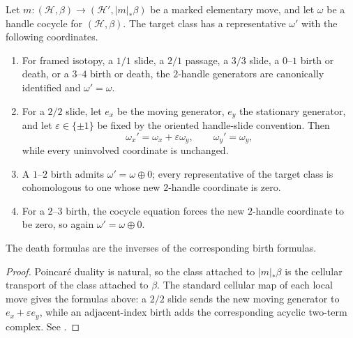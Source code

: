 \begin{proposition}
\label{prop:marking-coordinate-transport}
Let \(m\colon(\mathcal H,\beta)\to
(\mathcal H',|m|_*\beta)\) be a marked elementary move, and let \(\omega\)
be a handle cocycle for \((\mathcal H,\beta)\).  The target class has a
representative \(\omega'\) with the following coordinates.
\begin{enumerate}[label=(\roman*),ref=\roman*]
  \item For framed isotopy, a \(1/1\) slide, a \(2/1\) passage, a
  \(3/3\) slide, a \(0\)--\(1\) birth or death, or a \(3\)--\(4\) birth or
  death, the \(2\)-handle generators are canonically identified and
  \(\omega'=\omega\).

  \item For a \(2/2\) slide, let \(e_x\) be the moving generator,
  \(e_y\) the stationary generator, and let
  \(\varepsilon\in\{\pm1\}\) be fixed by the oriented handle-slide
  convention.  Then
  \begin{equation}
    \omega_x'=\omega_x+\varepsilon\omega_y,
    \qquad
    \omega_y'=\omega_y,
    \label{eq:two-two-marking-transport}
  \end{equation}
  while every uninvolved coordinate is unchanged.

  \item A \(1\)--\(2\) birth admits \(\omega'=\omega\oplus0\); every
  representative of the target class is cohomologous to one whose new
  \(2\)-handle coordinate is zero.

  \item For a \(2\)--\(3\) birth, the cocycle equation forces the new
  \(2\)-handle coordinate to be zero, so again
  \(\omega'=\omega\oplus0\).
\end{enumerate}
The death formulas are the inverses of the corresponding birth formulas.
\end{proposition}

\begin{proof}
Poincar\'e duality is natural, so the class attached to \(|m|_*\beta\) is
the cellular transport of the class attached to \(\beta\).  The standard
cellular map of each local move gives the formulas above: a \(2/2\) slide
sends the new moving generator to \(e_x+\varepsilon e_y\), while an
adjacent-index birth adds the corresponding acyclic two-term complex.  See
\cite[Sections~4.1--4.2]{DurstGeigesKegel2019}.
\end{proof}

